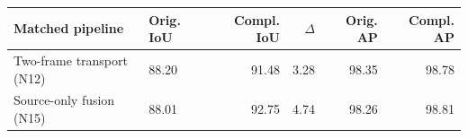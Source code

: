 \begin{tabular}{llrrrr}
\toprule
Matched pipeline & Orig. IoU & Compl. IoU & $\Delta$ & Orig. AP & Compl. AP \\
\midrule
Two-frame transport (N12) & 88.20 & 91.48 & 3.28 & 98.35 & 98.78 \\
Source-only fusion (N15) & 88.01 & 92.75 & 4.74 & 98.26 & 98.81 \\
\bottomrule
\end{tabular}
